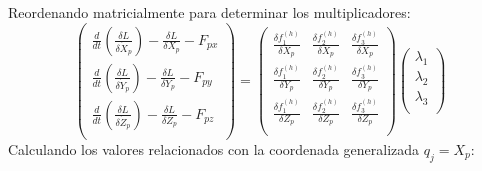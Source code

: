             Reordenando matricialmente para determinar los multiplicadores:
            \begin{equation}
             \left( \begin{matrix}
            \frac{d}{dt} \left( \frac{ \delta L}{ \delta \dot{X}_{p}} \right) -\frac{ \delta L}{ \delta X_{p}}-F_{px}\\
            \frac{d}{dt} \left( \frac{ \delta L}{ \delta \dot{Y}_{p}} \right) -\frac{ \delta L}{ \delta Y_{p}}-F_{py}\\
            \frac{d}{dt} \left( \frac{ \delta L}{ \delta \dot{Z}_{p}} \right) -\frac{ \delta L}{ \delta Z_{p}}-F_{pz}\\
            \end{matrix}
             \right) = \left( \begin{matrix}
            \frac{ \delta f_{1}^{ \left( h \right) }}{ \delta X_{p}}  &  \frac{ \delta f_{2}^{ \left( h \right) }}{ \delta X_{p}}  &  \frac{ \delta f_{3}^{ \left( h \right) }}{ \delta X_{p}}\\
            \frac{ \delta f_{1}^{ \left( h \right) }}{ \delta Y_{p}}  &  \frac{ \delta f_{2}^{ \left( h \right) }}{ \delta Y_{p}}  &  \frac{ \delta f_{3}^{ \left( h \right) }}{ \delta Y_{p}}\\
            \frac{ \delta f_{1}^{ \left( h \right) }}{ \delta Z_{p}}  &  \frac{ \delta f_{2}^{ \left( h \right) }}{ \delta Z_{p}}  &  \frac{ \delta f_{3}^{ \left( h \right) }}{ \delta Z_{p}}\\
            \end{matrix}
             \right)  \left( \begin{matrix}
             \lambda _{1}\\
             \lambda _{2}\\
             \lambda _{3}\\
            \end{matrix}
             \right)
             \label{eq:matriz_lagra}
            \end{equation}
            Calculando los valores relacionados con la coordenada generalizada  \( q_{j}=X_{p} \): 
